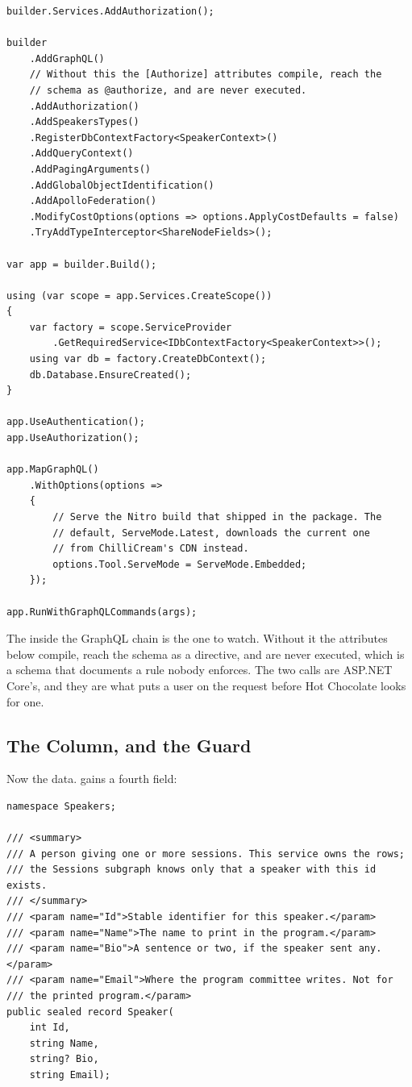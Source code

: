 \begin{verbatim}
builder.Services.AddAuthorization();

builder
    .AddGraphQL()
    // Without this the [Authorize] attributes compile, reach the
    // schema as @authorize, and are never executed.
    .AddAuthorization()
    .AddSpeakersTypes()
    .RegisterDbContextFactory<SpeakerContext>()
    .AddQueryContext()
    .AddPagingArguments()
    .AddGlobalObjectIdentification()
    .AddApolloFederation()
    .ModifyCostOptions(options => options.ApplyCostDefaults = false)
    .TryAddTypeInterceptor<ShareNodeFields>();

var app = builder.Build();

using (var scope = app.Services.CreateScope())
{
    var factory = scope.ServiceProvider
        .GetRequiredService<IDbContextFactory<SpeakerContext>>();
    using var db = factory.CreateDbContext();
    db.Database.EnsureCreated();
}

app.UseAuthentication();
app.UseAuthorization();

app.MapGraphQL()
    .WithOptions(options =>
    {
        // Serve the Nitro build that shipped in the package. The
        // default, ServeMode.Latest, downloads the current one
        // from ChilliCream's CDN instead.
        options.Tool.ServeMode = ServeMode.Embedded;
    });

app.RunWithGraphQLCommands(args);
\end{verbatim}

%
The  inside the GraphQL chain is the one to watch.
Without it the attributes below compile, reach the schema as a directive, and
are never executed, which is a schema that documents a rule nobody enforces.
The two  calls are ASP.NET Core's, and they are what puts a user
on the request before Hot Chocolate looks for one.

\subsection{The Column, and the Guard}

%
Now the data.  gains a fourth field:

\begin{verbatim}
namespace Speakers;

/// <summary>
/// A person giving one or more sessions. This service owns the rows;
/// the Sessions subgraph knows only that a speaker with this id exists.
/// </summary>
/// <param name="Id">Stable identifier for this speaker.</param>
/// <param name="Name">The name to print in the program.</param>
/// <param name="Bio">A sentence or two, if the speaker sent any.</param>
/// <param name="Email">Where the program committee writes. Not for
/// the printed program.</param>
public sealed record Speaker(
    int Id,
    string Name,
    string? Bio,
    string Email);
\end{verbatim}


